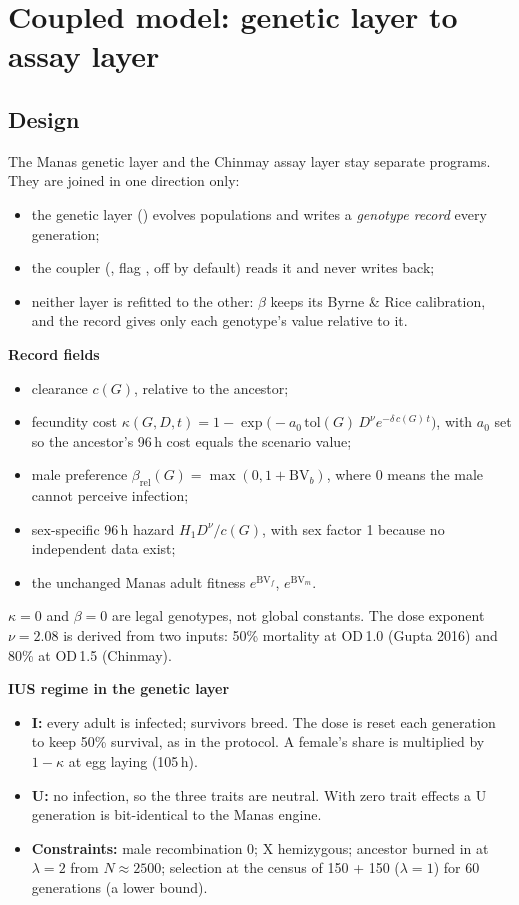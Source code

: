 \chapter{Coupled model: genetic layer to assay layer}\label{ch:coupling}

\section{Design}
The Manas genetic layer and the Chinmay assay layer stay separate programs. They are joined in one direction only:
\begin{itemize}
\item the genetic layer () evolves populations and writes a \emph{genotype record} every generation;
\item the coupler (, flag , off by default) reads it and never writes back;
\item neither layer is refitted to the other: $\beta$ keeps its Byrne \& Rice calibration, and the record gives only each genotype's value relative to it.
\end{itemize}

\textbf{Record fields}
\begin{itemize}
\item clearance $c(G)$, relative to the ancestor;
\item fecundity cost $\kappa(G,D,t)=1-\exp\!\big(-a_0\,\mathrm{tol}(G)\,D^{\nu}e^{-\delta\,c(G)\,t}\big)$, with $a_0$ set so the ancestor's 96\,h cost equals the scenario value;
\item male preference $\beta_\mathrm{rel}(G)=\max(0,1+\mathrm{BV}_b)$, where 0 means the male cannot perceive infection;
\item sex-specific 96\,h hazard $H_1D^{\nu}/c(G)$, with sex factor 1 because no independent data exist;
\item the unchanged Manas adult fitness $e^{\mathrm{BV}_f}$, $e^{\mathrm{BV}_m}$.
\end{itemize}
$\kappa=0$ and $\beta=0$ are legal genotypes, not global constants. The dose exponent $\nu=2.08$ is derived from two inputs: 50\% mortality at OD\,1.0 (Gupta 2016) and 80\% at OD\,1.5 (Chinmay).

\textbf{IUS regime in the genetic layer}
\begin{itemize}
\item \textbf{I:} every adult is infected; survivors breed. The dose is reset each generation to keep 50\% survival, as in the protocol. A female's share is multiplied by $1-\kappa$ at egg laying (105\,h).
\item \textbf{U:} no infection, so the three traits are neutral. With zero trait effects a U generation is bit-identical to the Manas engine.
\item \textbf{Constraints:} male recombination 0; X hemizygous; ancestor burned in at $\lambda=2$ from $N\approx2500$; selection at the census of 150 + 150 ($\lambda=1$) for 60 generations (a lower bound).
\end{itemize}

